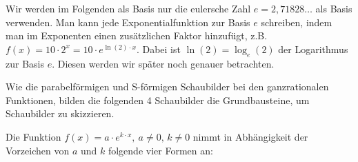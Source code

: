 Wir werden im Folgenden als Basis nur die eulersche Zahl \(e=2,71828\dots\) als Basis verwenden. Man kann jede Exponentialfunktion zur Basis \(e\) schreiben, indem man im Exponenten einen zusätzlichen Faktor hinzufügt, z.B. \(f(x)=10\cdot 2^x=10\cdot e^{\ln(2)\cdot x}\). Dabei ist \(\ln(2)=\log_e(2)\) der Logarithmus zur Basis \(e\). Diesen werden wir später noch genauer betrachten.

Wie die parabelförmigen und S-förmigen Schaubilder bei den ganzrationalen Funktionen, bilden die folgenden 4 Schaubilder die Grundbausteine, um Schaubilder zu skizzieren.

Die Funktion \(f(x)=a\cdot e^{k\cdot x},\ a\neq 0,\,k\neq 0\) nimmt in Abhängigkeit der Vorzeichen von \(a\) und \(k\) folgende vier Formen an:

\medskip

\begin{minipage}{\textwidth}
\end{minipage}

\medskip

\begin{minipage}{\textwidth}
\end{minipage}%

